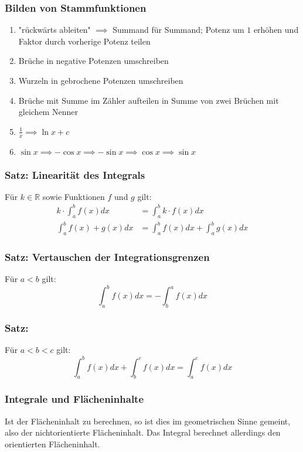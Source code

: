 \documentclass{article}
\begin{document}
  \subsubsection{Bilden von Stammfunktionen}
  \begin{enumerate}
  	\item "rückwärts ableiten" $\implies$ Summand für Summand; Potenz um $1$ erhöhen und Faktor durch vorherige Potenz teilen
  	\item Brüche in negative Potenzen umschreiben
  	\item Wurzeln in gebrochene Potenzen umschreiben
  	\item Brüche mit Summe im Zähler aufteilen in Summe von zwei Brüchen mit gleichem Nenner
  	\item $\frac{1}{x} \implies \ln{x} + c$
  	\item $\sin{x} \implies -\cos{x} \implies -\sin{x} \implies \cos{x} \implies \sin{x}$
  \end{enumerate}
  
  \subsubsection{Satz: Linearität des Integrals}
  Für $k \in \mathbb{R}$ sowie Funktionen $f$ und $g$ gilt: 
  \begin{align*}
  	k \cdot \int^b_a f(x) dx &= \int^b_a k \cdot f(x) dx \\
  	\int^b_a f(x) + g(x) dx &= \int^b_a f(x) dx + \int^b_a g(x) dx
  \end{align*}
  
  \subsubsection{Satz: Vertauschen der Integrationsgrenzen}
  Für $a < b$ gilt:
  \begin{equation*}
  	\int^b_a f(x) dx = - \int^a_b f(x) dx
  \end{equation*}
  
  \subsubsection{Satz:}
  Für $a < b < c$ gilt:
  \begin{equation*}
  	\int^b_a f(x) dx + \int^c_b f(x) dx = \int^c_a f(x) dx
  \end{equation*}
  
  \subsubsection{Integrale und Flächeninhalte}
  Ist der Flächeninhalt zu berechnen, so ist dies im geometrischen Sinne gemeint, also der nichtorientierte Flächeninhalt. Das Integral berechnet allerdings den orientierten Flächeninhalt. 
  
\end{document}
